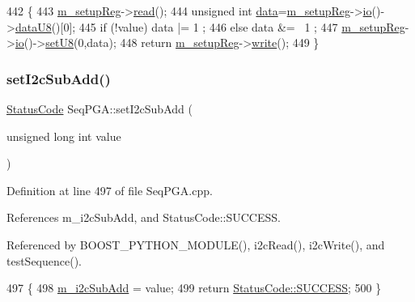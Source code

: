 \begin{DoxyCode}
442                                            \{
443   \hyperlink{classSeqPGA_a03269241e7fc26493cd0595beda334c2}{m\_setupReg}->\hyperlink{classIOobject_aa07610c11963b1db6710e3c76ceea456}{read}();
444   \textcolor{keywordtype}{unsigned} \textcolor{keywordtype}{int} \hyperlink{namespaceshell_a5ea2525995cedc3efd69ea8a7f034d1e}{data}=\hyperlink{classSeqPGA_a03269241e7fc26493cd0595beda334c2}{m\_setupReg}->\hyperlink{classIOobject_af04fb94137c3d86849f478ac5afab5d1}{io}()->\hyperlink{classIOdata_a75e9c318dbac3a39402179070943d4bc}{dataU8}()[0];
445   \textcolor{keywordflow}{if} (!value) data |= 1  ;
446   \textcolor{keywordflow}{else}        data &= ~1 ;
447   \hyperlink{classSeqPGA_a03269241e7fc26493cd0595beda334c2}{m\_setupReg}->\hyperlink{classIOobject_af04fb94137c3d86849f478ac5afab5d1}{io}()->\hyperlink{classIOdata_a6c4fb2f2af01889ada889c2b7aceb24d}{setU8}(0,data);
448   \textcolor{keywordflow}{return} \hyperlink{classSeqPGA_a03269241e7fc26493cd0595beda334c2}{m\_setupReg}->\hyperlink{classIOobject_a9f6984bc9f0fadcf800f1be2523ac744}{write}();
449 \}
\end{DoxyCode}
\mbox{\label{classSeqPGA_a348c5d982223fb5cf2878e5bf3c6429c}} 
\subsubsection{\texorpdfstring{set\+I2c\+Sub\+Add()}{setI2cSubAdd()}}
{\footnotesize\ttfamily \hyperlink{classStatusCode}{Status\+Code} Seq\+P\+G\+A\+::set\+I2c\+Sub\+Add (\begin{DoxyParamCaption}\item[{unsigned long int}]{value }\end{DoxyParamCaption})}



Definition at line 497 of file Seq\+P\+G\+A.\+cpp.



References m\+\_\+i2c\+Sub\+Add, and Status\+Code\+::\+S\+U\+C\+C\+E\+SS.



Referenced by B\+O\+O\+S\+T\+\_\+\+P\+Y\+T\+H\+O\+N\+\_\+\+M\+O\+D\+U\+L\+E(), i2c\+Read(), i2c\+Write(), and test\+Sequence().


\begin{DoxyCode}
497                                                         \{
498   \hyperlink{classSeqPGA_a82bda98edb9681aff47733e83ac8bc4f}{m\_i2cSubAdd} = value;
499   \textcolor{keywordflow}{return} \hyperlink{classStatusCode_a6f565cbeadc76d14c72f047e5e85eb4badd0da38d3ba0d922efd1f4619bc37ad8}{StatusCode::SUCCESS};
500 \}
\end{DoxyCode}
\mbox{\label{classObject_a398fe08cba594a0ce6891d59fe4f159f}} 
